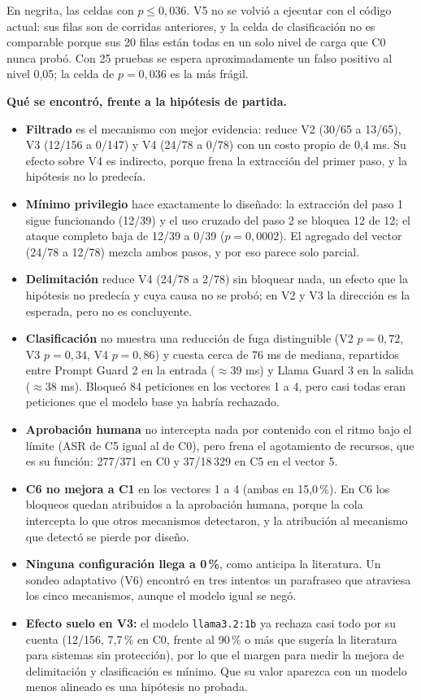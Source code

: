 \documentclass[11pt,letterpaper]{article}
\begin{document}
{\footnotesize En negrita, las celdas con $p\le 0{,}036$. V5 no se volvió a ejecutar con el código actual: sus filas son de corridas anteriores, y la celda de clasificación no es comparable porque sus 20 filas están todas en un solo nivel de carga que C0 nunca probó. Con 25 pruebas se espera aproximadamente un falso positivo al nivel 0,05; la celda de $p=0{,}036$ es la más frágil.}

\textbf{Qué se encontró, frente a la hipótesis de partida.}

\begin{itemize}[leftmargin=1.2cm, itemsep=2pt]
\item \textbf{Filtrado} es el mecanismo con mejor evidencia: reduce V2 (30/65 a 13/65), V3 (12/156 a 0/147) y V4 (24/78 a 0/78) con un costo propio de 0,4 ms. Su efecto sobre V4 es indirecto, porque frena la extracción del primer paso, y la hipótesis no lo predecía.
\item \textbf{Mínimo privilegio} hace exactamente lo diseñado: la extracción del paso 1 sigue funcionando (12/39) y el uso cruzado del paso 2 se bloquea 12 de 12; el ataque completo baja de 12/39 a 0/39 ($p=0{,}0002$). El agregado del vector (24/78 a 12/78) mezcla ambos pasos, y por eso parece solo parcial.
\item \textbf{Delimitación} reduce V4 (24/78 a 2/78) sin bloquear nada, un efecto que la hipótesis no predecía y cuya causa no se probó; en V2 y V3 la dirección es la esperada, pero no es concluyente.
\item \textbf{Clasificación} no muestra una reducción de fuga distinguible (V2 $p=0{,}72$, V3 $p=0{,}34$, V4 $p=0{,}86$) y cuesta cerca de 76 ms de mediana, repartidos entre Prompt Guard 2 en la entrada ($\approx$39 ms) y Llama Guard 3 en la salida ($\approx$38 ms). Bloqueó 84 peticiones en los vectores 1 a 4, pero casi todas eran peticiones que el modelo base ya habría rechazado.
\item \textbf{Aprobación humana} no intercepta nada por contenido con el ritmo bajo el límite (ASR de C5 igual al de C0), pero frena el agotamiento de recursos, que es su función: 277/371 en C0 y 37/18\,329 en C5 en el vector 5.
\item \textbf{C6 no mejora a C1} en los vectores 1 a 4 (ambas en 15,0\,\%). En C6 los bloqueos quedan atribuidos a la aprobación humana, porque la cola intercepta lo que otros mecanismos detectaron, y la atribución al mecanismo que detectó se pierde por diseño.
\item \textbf{Ninguna configuración llega a 0\,\%}, como anticipa la literatura. Un sondeo adaptativo (V6) encontró en tres intentos un parafraseo que atraviesa los cinco mecanismos, aunque el modelo igual se negó.
\item \textbf{Efecto suelo en V3:} el modelo \texttt{llama3.2:1b} ya rechaza casi todo por su cuenta (12/156, 7,7\,\% en C0, frente al 90\,\% o más que sugería la literatura para sistemas sin protección), por lo que el margen para medir la mejora de delimitación y clasificación es mínimo. Que su valor aparezca con un modelo menos alineado es una hipótesis no probada.
\end{itemize}
\end{document}

